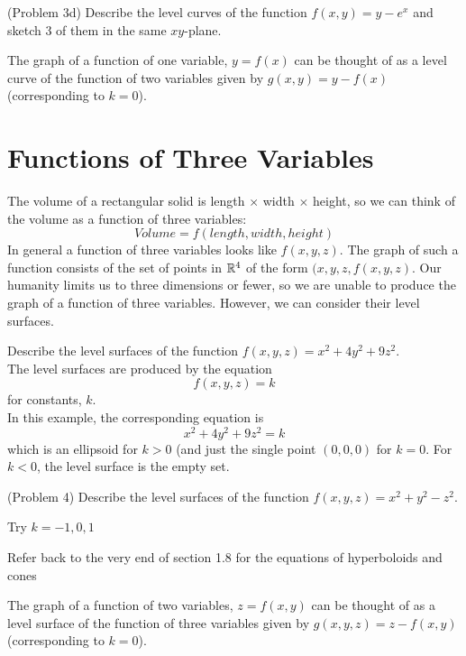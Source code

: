 \documentclass[handout]{ximera}
\begin{document}
\begin{problem}(Problem 3d)
Describe the level curves of the function $f(x,y) = y - e^x$ and sketch 3 of them in the same $xy$-plane.\\
\end{problem}

\begin{remark}
The graph of a function of one variable, $y= f(x)$ can be thought of as a level curve of the function of two variables given by $g(x, y) = y-f(x)$
(corresponding to $k = 0$).
\end{remark}

\section{Functions of Three Variables}
The volume of a rectangular solid is length $\times$ width $\times $ height, so we can think of the volume as a function of three variables:
\[
Volume = f(length, width, height)
\]
In general a function of three variables looks like $f(x, y, z)$.
The graph of such a function consists of the set of points in $\mathbb R^4$ of the form $(x, y, z, f(x, y, z)$.
Our humanity limits us to three dimensions or fewer, so we are unable to produce the graph of a function of three variables.
However, we can consider their level surfaces.

\begin{example}[Example 4]
Describe the level surfaces of the function $f(x, y, z) = x^2 + 4y^2 + 9 z^2$.\\
The level surfaces are produced by the equation
\[
f(x, y, z) = k
\]
for constants, $k$.\\
In this example, the corresponding equation is
\[
x^2 + 4y^2 + 9z^2 = k
\]
which is an ellipsoid for $k >0$ (and just the single point $(0, 0, 0)$ for $k = 0$.
For $k<0$, the level surface is the empty set.
\end{example}

\begin{problem}(Problem 4)
Describe the level surfaces of the function $f(x, y, z) = x^2 + y^2 - z^2$.\\
\begin{hint}
Try $k = -1, 0, 1$
\end{hint}
\begin{hint}
Refer back to the very end of section 1.8 for the equations of hyperboloids and cones
\end{hint}
\end{problem}

\begin{remark}
The graph of a function of two variables, $z= f(x,y)$ can be thought of as a level surface of the function of three variables given by $g(x, y, z) = z-f(x,y)$
(corresponding to $k = 0$).
\end{remark}
\end{document}
